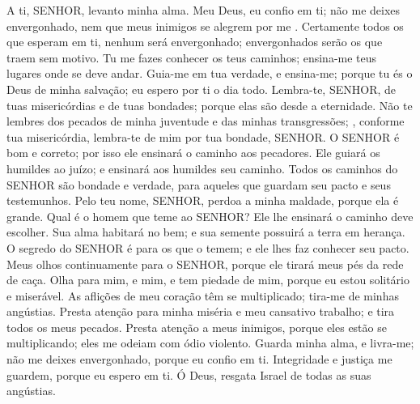 
{\PP 
  A ti, SENHOR, levanto minha alma.
  Meu Deus, eu confio em ti; não me deixes envergonhado, nem que meus inimigos se alegrem por me
{} .
  Certamente todos os que esperam em ti, nenhum será envergonhado; envergonhados serão os que traem sem motivo.
  Tu me fazes conhecer os teus caminhos; ensina-me teus lugares onde se deve andar.
  Guia-me em tua verdade, e ensina-me; porque tu és o Deus de minha salvação; eu espero por ti o dia todo.
  Lembra-te, SENHOR, de tuas misericórdias e de tuas bondades; porque elas são desde a eternidade.
  Não te lembres dos pecados de minha juventude e das minhas transgressões;
{},  conforme tua misericórdia, lembra-te de mim por tua bondade, SENHOR.
  O SENHOR é bom e correto; por isso ele ensinará o caminho aos pecadores.
  Ele guiará os humildes ao
{} juízo; e ensinará aos humildes seu caminho.
  Todos os caminhos do SENHOR são bondade e verdade, para aqueles que guardam seu pacto e seus testemunhos.
  Pelo teu nome, SENHOR, perdoa a minha maldade, porque ela é grande.
  Qual é o homem que teme ao SENHOR? Ele lhe ensinará o caminho
{} deve escolher.
  Sua alma habitará no bem; e sua semente
{} possuirá a terra em herança.
  O segredo do SENHOR é para os que o temem; e ele lhes faz conhecer seu pacto.
  Meus olhos
{} continuamente
{} para o SENHOR, porque ele tirará meus pés da rede de caça.
  Olha para mim, e mim, e tem piedade de mim, porque eu estou solitário e miserável.
  As aflições de meu coração têm se multiplicado; tira-me de minhas angústias.
  Presta atenção para minha miséria e meu cansativo trabalho; e tira todos os meus pecados.
  Presta atenção a meus inimigos, porque eles estão se multiplicando; eles me odeiam com ódio violento.
  Guarda minha alma, e livra-me; não me deixes envergonhado, porque eu confio em ti.
  Integridade e justiça me guardem, porque eu espero em ti.
  Ó Deus, resgata Israel de todas as suas angústias.
\par }


